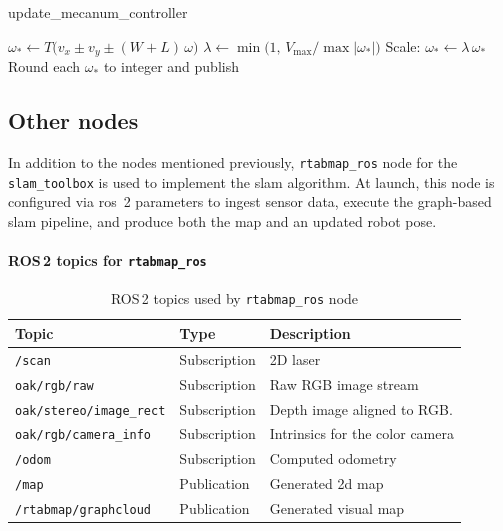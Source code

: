 \begin{algorithm}[H]
  \caption{update\_mecanum\_controller}
  \begin{algorithmic}[1]
    \State $\omega_{*} \gets T\bigl(v_x \pm v_y \pm (W+L)\,\omega\bigr)$
    \State $\lambda \gets \min\bigl(1,\,V_{\max}/\max|\omega_*|\bigr)$
    \State Scale: $\omega_* \gets \lambda\,\omega_*$
    \State Round each $\omega_*$ to integer and publish
    \EndFunction
  \end{algorithmic}
\end{algorithm}

\subsection{Other nodes}

In addition to the nodes mentioned previously, \texttt{rtabmap\_ros} node for the \texttt{slam\_toolbox} is used to implement the \gls{slam} algorithm. At launch, this node is configured via \gls{ros}~2 parameters to ingest sensor data, execute the graph-based \gls{slam} pipeline, and produce both the map and an updated robot pose.

\paragraph*{ROS\,2 topics for \texttt{rtabmap\_ros}}
\begin{table}[H]
  \centering
  \begin{tabular}{lll}
    \toprule
    \textbf{Topic}                  & \textbf{Type} & \textbf{Description}            \\
    \midrule
    \texttt{/scan}                  & Subscription  & 2D laser                        \\
    \texttt{oak/rgb/raw}            & Subscription  & Raw RGB image stream            \\
    \texttt{oak/stereo/image\_rect} & Subscription  & Depth image aligned to RGB.     \\
    \texttt{oak/rgb/camera\_info}   & Subscription  & Intrinsics for the color camera \\
    \texttt{/odom}                  & Subscription  & Computed odometry               \\
    \texttt{/map}                   & Publication   & Generated 2d map                \\
    \texttt{/rtabmap/graphcloud}    & Publication   & Generated visual map            \\
    \bottomrule
  \end{tabular}
  \caption{ROS\,2 topics used by \texttt{rtabmap\_ros} node}
  \label{tab:rtabmap-topics}
\end{table}

